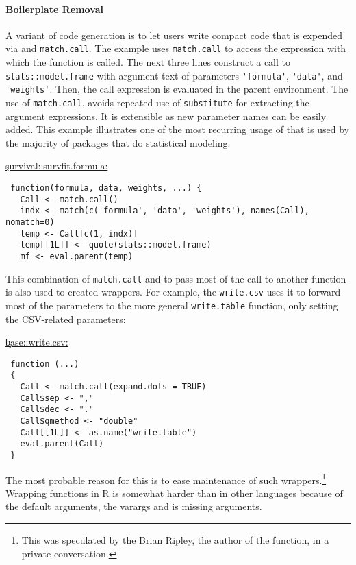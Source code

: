 \documentclass[screen,acmsmall]{acmart}%
\renewcommand{\k}[1]{\lstinline |#1|\xspace}
\begin{document}
\paragraph{Boilerplate Removal} 
A variant of code generation is to let users write compact code that is
expended via \eval and \k{match.call}. The example uses \k{match.call} to
access the expression with which the function is called. The next three lines
construct a call to \k{stats::model.frame} with argument text of parameters
\k{'formula'}, \k{'data'}, and \k{'weights'}. Then, the call expression is
evaluated in the parent environment. The use of \k{match.call}, avoids repeated
use of \k{substitute} for extracting the argument expressions. It is extensible
as new parameter names can be easily added. This example illustrates one of the
most recurring usage of \eval that is used by the majority of packages that do
statistical modeling.

\begin{minipage}{.95\textwidth}
  \medskip\underline{\c{survival::survfit.formula}:}
\begin{lstlisting}
 function(formula, data, weights, ...) {
   Call <- match.call()
   indx <- match(c('formula', 'data', 'weights'), names(Call), nomatch=0)
   temp <- Call[c(1, indx)]
   temp[[1L]] <- quote(stats::model.frame)
   mf <- eval.parent(temp)
\end{lstlisting}\medskip
\end{minipage}

This combination of \k{match.call} and \eval to pass most of the call to
another function is also used to created wrappers. For example, the
\k{write.csv} uses it to forward most of the parameters to the more general
\k{write.table} function, only setting the CSV-related parameters:

\begin{minipage}{.95\textwidth}
  \medskip\underline{\c{base::write.csv}:}
\begin{lstlisting}
 function (...)
 {
   Call <- match.call(expand.dots = TRUE)
   Call$sep <- ","
   Call$dec <- "."
   Call$qmethod <- "double"
   Call[[1L]] <- as.name("write.table")
   eval.parent(Call)
 }
\end{lstlisting}\medskip
\end{minipage}

The most probable reason for this is to ease maintenance of such
wrappers.\footnote{This was speculated by the Brian Ripley, the author of the
function, in a private conversation.} Wrapping functions in R is somewhat
harder than in other languages because of the default arguments, the varargs
and is missing arguments.
\end{document}
